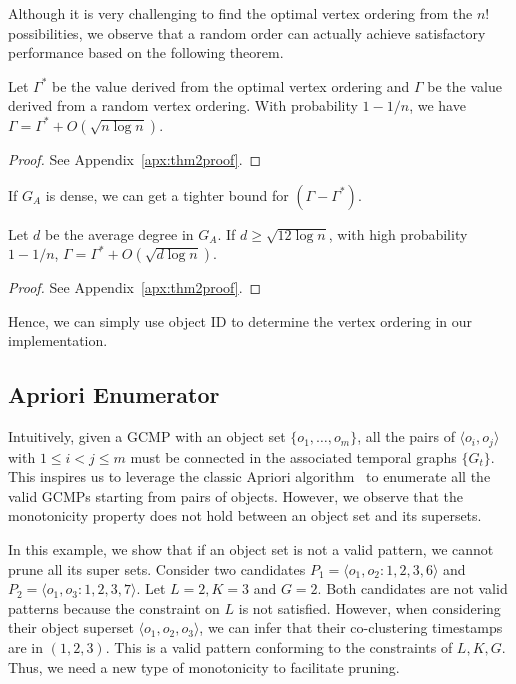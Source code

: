 Although it is very challenging to find the optimal vertex ordering from the $n!$ possibilities, we observe that a random order can actually achieve satisfactory performance based on the following theorem.


\begin{theorem}
\label{THM:SPM_LB}
Let $\Gamma^*$ be the value derived from the optimal vertex ordering and  $\Gamma$ be the value derived from a random vertex ordering. With probability $1-1/n$, we have $\Gamma = \Gamma^* + O(\sqrt{n \log n})$.
\end{theorem}
\begin{proof}
See Appendix~\ref{apx:thm2proof}.
\end{proof}
If $G_A$ is dense, we can get a tighter bound for $(\Gamma - \Gamma^*)$.
\begin{theorem}
\label{THM:SPM_LB_INC}
Let $d$ be the average degree in $G_A$. If $d\geq \sqrt{12\log n}$, with
high probability $1-1/n$, $\Gamma = \Gamma^* + O(\sqrt{d\log n})$.
\end{theorem}
\begin{proof}
See Appendix~\ref{apx:thm2proof}.
\end{proof}
Hence, we can simply use object ID to determine the vertex ordering in our implementation.


\subsection{Apriori Enumerator}
Intuitively, given a GCMP with an object set $\{o_1,\ldots,o_m\}$, 
all the pairs of $\langle o_i,o_j \rangle$ with $1\leq i<j\leq m$ must 
be connected in the associated temporal graphs $\{G_t\}$. This inspires us to leverage the classic Apriori algorithm~\cite{agrawal1994fast} to enumerate all the valid GCMPs starting from pairs of objects. However, we observe that the monotonicity property does not hold between an object set and its supersets.

\begin{example}
In this example, we show that if an object set is not a valid pattern, we cannot prune all its super sets.
Consider two candidates $P_1=\langle o_1,o_2:1,2,3,6 \rangle$ and $P_2=\langle o_1,o_3:1,2,3,7 \rangle$. 
Let $L=2,K=3$ and $G=2$. Both candidates are not valid patterns because the constraint on $L$ is not satisfied. 
However, when considering their object superset $\langle o_1,o_2,o_3 \rangle$, we can infer that their co-clustering timestamps are in $(1,2,3)$. This is a valid pattern conforming to the constraints of $L,K,G$. Thus, we need a new type of monotonicity to facilitate pruning.
\end{example}   


